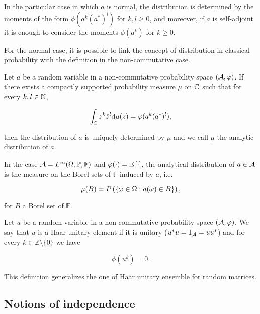     In the particular case in which $a$ is normal, the distribution is determined by the moments of the form $\phi(a^k(a^*)^l)$ for $k,l \ge 0$, and moreover, if $a$ is self-adjoint it is enough to consider the moments $\phi(a^k)$ for $k\ge 0$. 
    
    For the normal case, it is possible to link the concept of distribution in classical probability with the definition in the non-commutative case.

    \begin{definition}
        Let $a$ be a random variable in a non-commutative probability space $(\A,\phi)$. If there exists a compactly supported probability measure $\mu$ on $\C$ such that for every $k,l\in \N$,

        \begin{equation*}
            \int_\C z^k \bar{z}^l \d \mu(z) = \phi(a^k(a^*)^l),
        \end{equation*}

        then the distribution of $a$ is uniquely determined by $\mu$ and we call $\mu$ the analytic distribution of $a$.
    \end{definition}

    In the case $\A = L^{\infty}(\Omega,\mathbb P, \mathbb F)$ and $\phi(\cdot) = \E{\cdot}$, the analytical distribution of $a \in \A$ is the measure on the Borel sets of $\mathbb F$ induced by $a$, i.e.

    \begin{equation*}
        \mu(B) = \P{ \{ \omega \in \Omega : a(\omega) \in B \} },
    \end{equation*}

    \noindent for $B$ a Borel set of $\mathbb F$.

    \begin{example}
        Let $u$ be a random variable in a non-commutative probability space $(\A,\phi)$. We say that $u$ is a Haar unitary element if it is unitary ($u^*u = 1_\A = uu^*$) and for every $k\in \mathbb Z \setminus \{0\}$ we have

        \begin{equation*}
            \phi(u^k) = 0.
        \end{equation*}
    \end{example}

    This definition generalizes the one of Haar unitary ensemble for random matrices.

\subsection{Notions of independence}

